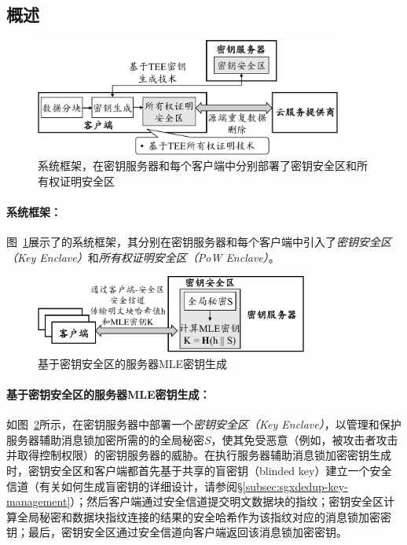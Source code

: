 \subsection{概述}
\label{subsec:sgxdedup-arch}

\begin{figure}[!htb]
  \centering
  \includegraphics[width=0.9\textwidth]{pic/sgxdedup/sgxdedup-arch.pdf}
  \caption{\sysnameS 系统框架，在密钥服务器和每个客户端中分别部署了密钥安全区和所有权证明安全区}
  \label{fig:sgxdedup-overview}
\end{figure}

\paragraph*{\sysnameS 系统框架：}图~\ref{fig:sgxdedup-overview}展示了\sysnameS 的系统框架，其分别在密钥服务器和每个客户端中引入了\textit{密钥安全区（Key Enclave）}和\textit{所有权证明安全区（PoW Enclave）}。 

\begin{figure}[!htb]
  \centering
  \includegraphics[width=0.8\textwidth]{pic/sgxdedup/key-enclave.pdf}
  \caption{基于密钥安全区的服务器MLE密钥生成}
  \label{fig:sgxdedup-overview-key}
\end{figure}

\paragraph*{基于密钥安全区的服务器MLE密钥生成：}如图~\ref{fig:sgxdedup-overview-key}所示，\sysnameS 在密钥服务器中部署一个\textit{密钥安全区（Key Enclave）}，以管理和保护服务器辅助消息锁加密所需的的全局秘密$S$，使其免受恶意（例如，被攻击者攻击并取得控制权限）的密钥服务器的威胁。在执行服务器辅助消息锁加密密钥生成时，密钥安全区和客户端都首先基于共享的盲密钥（blinded key）建立一个安全信道（有关如何生成盲密钥的详细设计，请参阅\S\ref{subsec:sgxdedup-key-management}）；然后客户端通过安全信道提交明文数据块的指纹；密钥安全区计算全局秘密和数据块指纹连接的结果的安全哈希作为该指纹对应的消息锁加密密钥；最后，密钥安全区通过安全信道向客户端返回该消息锁加密密钥。

